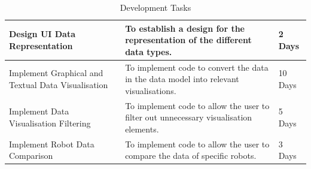 \documentclass[hidelinks,10pt]{article}
\begin{document}
\begin{table}[H]
\begin{tabular}[h]{ |>{\raggedright}p{5cm}|>{\raggedright}p{7cm}|p{3cm}| }
  Design UI Data Representation 					& To establish a design for the representation of the different data types. 											& 2 Days \\ \hline
  Implement Graphical and Textual Data Visualisation & To implement code to convert the data in the data model into relevant visualisations. 								& 10 Days \\ \hline
  Implement Data Visualisation Filtering 			& To implement code to allow the user to filter out unnecessary visualisation elements. 								& 5 Days \\ \hline
  Implement Robot Data Comparison 					& To implement code to allow the user to compare the data of specific robots. 											& 3 Days \\ \hline
\end{tabular}
\caption{Development Tasks\label{DevTaskTable}}
\end{table}

\newpage
\end{document}
